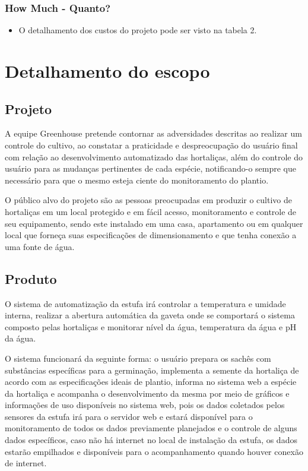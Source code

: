 	\subsubsection{How Much - Quanto?}
	
	\begin{itemize}
		
		\item O detalhamento dos custos do projeto pode ser visto na tabela 2.
		
	\end{itemize}
  	
\section{Detalhamento do escopo}

\subsection{Projeto}
A equipe Greenhouse pretende contornar as adversidades descritas ao realizar um controle do cultivo, ao constatar a praticidade e despreocupação do usuário final com relação ao desenvolvimento automatizado das hortaliças, além do controle do usuário para as mudanças pertinentes de cada espécie, notificando-o sempre que necessário para que o mesmo esteja ciente do monitoramento do plantio.

O público alvo do projeto são as pessoas preocupadas em produzir o cultivo de hortaliças em um local protegido e em fácil acesso, monitoramento e controle de seu equipamento, sendo este instalado em uma casa, apartamento ou em qualquer local que forneça suas especificações de dimensionamento e que tenha conexão a uma fonte de água.

\subsection{Produto}

O sistema de automatização da estufa irá controlar a temperatura e umidade interna, realizar a abertura automática da gaveta onde se comportará o sistema composto pelas hortaliças e monitorar nível da água, temperatura da água e pH da água.

O sistema funcionará da seguinte forma: o usuário prepara os sachês com substâncias específicas para a germinação, implementa a semente da hortaliça de acordo com as especificações ideais de plantio, informa no sistema web a espécie da hortaliça e acompanha o desenvolvimento da mesma por meio de gráficos e informações de uso disponíveis no sistema web, pois os dados coletados pelos sensores da estufa irá para o servidor web e estará disponível para o monitoramento de todos os dados previamente planejados e o controle de alguns dados específicos, caso não há internet no local de instalação da estufa, os dados estarão empilhados e disponíveis para o acompanhamento quando houver conexão de internet.


